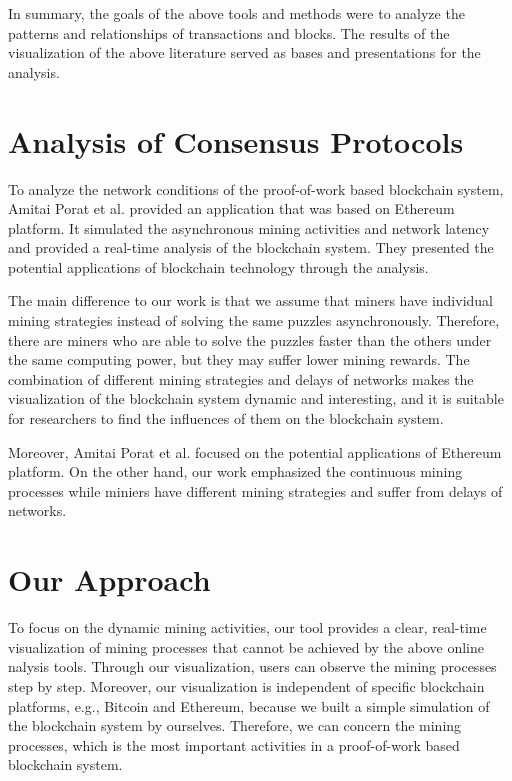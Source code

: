 In summary, the goals of the above tools and methods were to analyze the patterns and relationships of transactions and blocks. The results of the visualization of the above literature served as bases and presentations for the analysis. 

\section{Analysis of Consensus Protocols}

To analyze the network conditions of the proof-of-work based blockchain system, Amitai Porat et al. \cite{Porat} provided an application that was based on Ethereum platform. It simulated the asynchronous mining activities and network latency and provided a real-time analysis of the blockchain system. They presented the potential applications of blockchain technology through the analysis.

The main difference to our work is that we assume that miners have individual mining strategies instead of solving the same puzzles asynchronously. Therefore, there are miners who are able to solve the puzzles faster than the others under the same computing power, but they may suffer lower mining rewards. The combination of different mining strategies and delays of networks makes the visualization of the blockchain system dynamic and interesting, and it is suitable for researchers to find the influences of them on the blockchain system. 

Moreover, Amitai Porat et al. focused on the potential applications of Ethereum platform. On the other hand, our work emphasized the continuous mining processes while miniers have different mining strategies and suffer from delays of networks. 

\section{Our Approach}

To focus on the dynamic mining activities, our tool provides a clear, real-time visualization of mining processes that cannot be achieved by the above online nalysis tools. Through our visualization, users can observe the mining processes step by step. Moreover, our visualization is independent of specific blockchain platforms, e.g., Bitcoin and Ethereum, because we built a simple simulation of the blockchain system by ourselves. Therefore, we can concern the mining processes, which is the most important activities in a proof-of-work based blockchain system.

